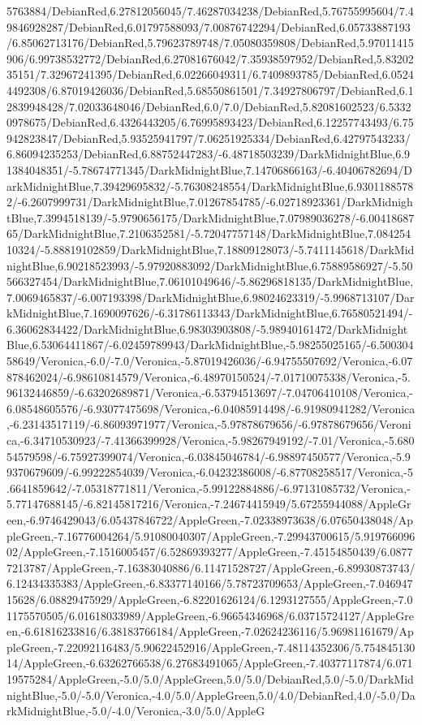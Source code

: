 {\begin{tikzternal}
5763884/DebianRed,6.27812056045/7.46287034238/DebianRed,5.76755995604/7.49846928287/DebianRed,6.01797588093/7.00876742294/DebianRed,6.05733887193/6.85062713176/DebianRed,5.79623789748/7.05080359808/DebianRed,5.97011415906/6.99738532772/DebianRed,6.27081676042/7.35938597952/DebianRed,5.8320235151/7.32967241395/DebianRed,6.02266049311/6.7409893785/DebianRed,6.05244492308/6.87019426036/DebianRed,5.68550861501/7.34927806797/DebianRed,6.12839948428/7.02033648046/DebianRed,6.0/7.0/DebianRed,5.82081602523/6.53320978675/DebianRed,6.4326443205/6.76995893423/DebianRed,6.12257743493/6.75942823847/DebianRed,5.93525941797/7.06251925334/DebianRed,6.42797543233/6.86094235253/DebianRed,6.88752447283/-6.48718503239/DarkMidnightBlue,6.91384048351/-5.78674771345/DarkMidnightBlue,7.14706866163/-6.40406782694/DarkMidnightBlue,7.39429695832/-5.76308248554/DarkMidnightBlue,6.93011885782/-6.2607999731/DarkMidnightBlue,7.01267854785/-6.02718923361/DarkMidnightBlue,7.3994518139/-5.9790656175/DarkMidnightBlue,7.07989036278/-6.0041868765/DarkMidnightBlue,7.2106352581/-5.72047757148/DarkMidnightBlue,7.08425410324/-5.88819102859/DarkMidnightBlue,7.18809128073/-5.7411145618/DarkMidnightBlue,6.90218523993/-5.97920883092/DarkMidnightBlue,6.75889586927/-5.50566327454/DarkMidnightBlue,7.06101049646/-5.86296818135/DarkMidnightBlue,7.0069465837/-6.007193398/DarkMidnightBlue,6.98024623319/-5.9968713107/DarkMidnightBlue,7.1690097626/-6.31786113343/DarkMidnightBlue,6.76580521494/-6.36062834422/DarkMidnightBlue,6.98303903808/-5.98940161472/DarkMidnightBlue,6.53064411867/-6.02459789943/DarkMidnightBlue,-5.98255025165/-6.50030458649/Veronica,-6.0/-7.0/Veronica,-5.87019426036/-6.94755507692/Veronica,-6.07878462024/-6.98610814579/Veronica,-6.48970150524/-7.01710075338/Veronica,-5.96132446859/-6.63202689871/Veronica,-6.53794513697/-7.04706410108/Veronica,-6.08548605576/-6.93077475698/Veronica,-6.04085914498/-6.91980941282/Veronica,-6.23143517119/-6.86093971977/Veronica,-5.97878679656/-6.97878679656/Veronica,-6.34710530923/-7.41366399928/Veronica,-5.98267949192/-7.01/Veronica,-5.68054579598/-6.75927399074/Veronica,-6.03845046784/-6.98897450577/Veronica,-5.99370679609/-6.99222854039/Veronica,-6.04232386008/-6.87708258517/Veronica,-5.6641859642/-7.05318771811/Veronica,-5.99122884886/-6.97131085732/Veronica,-5.77147688145/-6.82145817216/Veronica,-7.24674415949/5.67255944088/AppleGreen,-6.9746429043/6.05437846722/AppleGreen,-7.02338973638/6.07650438048/AppleGreen,-7.16776004264/5.91080040307/AppleGreen,-7.29943700615/5.91976609602/AppleGreen,-7.1516005457/6.52869393277/AppleGreen,-7.45154850439/6.08777213787/AppleGreen,-7.16383040886/6.11471528727/AppleGreen,-6.89930873743/6.12434335383/AppleGreen,-6.83377140166/5.78723709653/AppleGreen,-7.04694715628/6.08829475929/AppleGreen,-6.82201626124/6.1293127555/AppleGreen,-7.01175570505/6.01618033989/AppleGreen,-6.96654346968/6.03715724127/AppleGreen,-6.61816233816/6.38183766184/AppleGreen,-7.02624236116/5.96981161679/AppleGreen,-7.22092116483/5.90622452916/AppleGreen,-7.48114352306/5.75484513014/AppleGreen,-6.63262766538/6.27683491065/AppleGreen,-7.40377117874/6.07119575284/AppleGreen,-5.0/5.0/AppleGreen,5.0/5.0/DebianRed,5.0/-5.0/DarkMidnightBlue,-5.0/-5.0/Veronica,-4.0/5.0/AppleGreen,5.0/4.0/DebianRed,4.0/-5.0/DarkMidnightBlue,-5.0/-4.0/Veronica,-3.0/5.0/AppleG
\end{tikzternal}}
